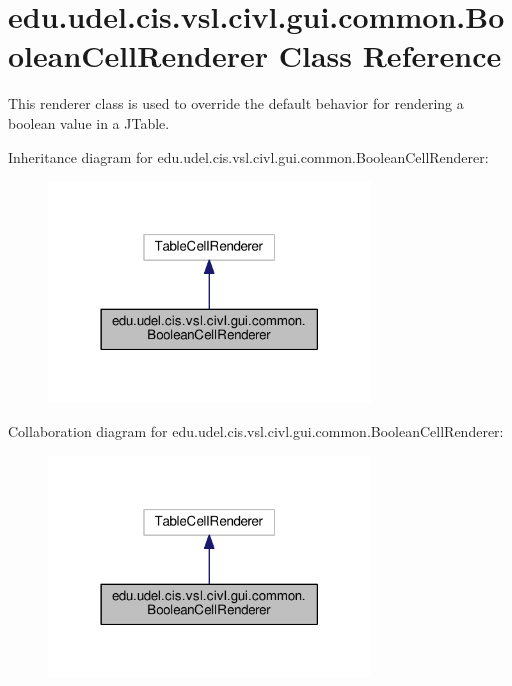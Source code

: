 \hypertarget{classedu_1_1udel_1_1cis_1_1vsl_1_1civl_1_1gui_1_1common_1_1BooleanCellRenderer}{}\section{edu.\+udel.\+cis.\+vsl.\+civl.\+gui.\+common.\+Boolean\+Cell\+Renderer Class Reference}
\label{classedu_1_1udel_1_1cis_1_1vsl_1_1civl_1_1gui_1_1common_1_1BooleanCellRenderer}


This renderer class is used to override the default behavior for rendering a boolean value in a J\+Table.  




Inheritance diagram for edu.\+udel.\+cis.\+vsl.\+civl.\+gui.\+common.\+Boolean\+Cell\+Renderer\+:
\nopagebreak
\begin{figure}[H]
\begin{center}
\leavevmode
\includegraphics[width=242pt]{classedu_1_1udel_1_1cis_1_1vsl_1_1civl_1_1gui_1_1common_1_1BooleanCellRenderer__inherit__graph}
\end{center}
\end{figure}


Collaboration diagram for edu.\+udel.\+cis.\+vsl.\+civl.\+gui.\+common.\+Boolean\+Cell\+Renderer\+:
\nopagebreak
\begin{figure}[H]
\begin{center}
\leavevmode
\includegraphics[width=242pt]{classedu_1_1udel_1_1cis_1_1vsl_1_1civl_1_1gui_1_1common_1_1BooleanCellRenderer__coll__graph}
\end{center}
\end{figure}
